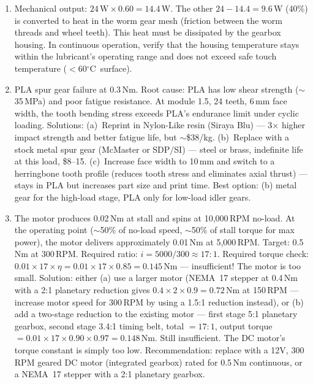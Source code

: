\documentclass[11pt,letterpaper,twoside,openany]{book}
\newcommand{\degC}{\ensuremath{{}^{\circ}\text{C}}}
\begin{document}
\begin{enumerate}[leftmargin=1.5em]
\item Mechanical output: $24\,\text{W} \times 0.60 = 14.4$\,W. The other $24 - 14.4 = 9.6$\,W (40\%) is converted to heat in the worm gear mesh (friction between the worm threads and wheel teeth). This heat must be dissipated by the gearbox housing. In continuous operation, verify that the housing temperature stays within the lubricant's operating range and does not exceed safe touch temperature ($< 60$\degC\ surface).

\item PLA spur gear failure at 0.3\,Nm. Root cause: PLA has low shear strength ($\sim$35\,MPa) and poor fatigue resistance. At module 1.5, 24 teeth, 6\,mm face width, the tooth bending stress exceeds PLA's endurance limit under cyclic loading. Solutions: (a)~Reprint in Nylon-Like resin (Siraya Blu) --- 3$\times$ higher impact strength and better fatigue life, but $\sim$\$38/kg. (b)~Replace with a stock metal spur gear (McMaster or SDP/SI) --- steel or brass, indefinite life at this load, \$8--15. (c)~Increase face width to 10\,mm and switch to a herringbone tooth profile (reduces tooth stress and eliminates axial thrust) --- stays in PLA but increases part size and print time. Best option: (b) metal gear for the high-load stage, PLA only for low-load idler gears.

\item The motor produces 0.02\,Nm at stall and spins at 10,000\,RPM no-load. At the operating point ($\sim$50\% of no-load speed, $\sim$50\% of stall torque for max power), the motor delivers approximately 0.01\,Nm at 5,000\,RPM. Target: 0.5\,Nm at 300\,RPM. Required ratio: $i = 5000/300 \approx 17:1$. Required torque check: $0.01 \times 17 \times \eta = 0.01 \times 17 \times 0.85 = 0.145$\,Nm --- insufficient! The motor is too small. Solution: either (a) use a larger motor (NEMA~17 stepper at 0.4\,Nm with a 2:1 planetary reduction gives $0.4 \times 2 \times 0.9 = 0.72$\,Nm at 150\,RPM --- increase motor speed for 300\,RPM by using a 1.5:1 reduction instead), or (b) add a two-stage reduction to the existing motor --- first stage 5:1 planetary gearbox, second stage 3.4:1 timing belt, total $= 17:1$, output torque $= 0.01 \times 17 \times 0.90 \times 0.97 = 0.148$\,Nm. Still insufficient. The DC motor's torque constant is simply too low. Recommendation: replace with a 12V, 300\,RPM geared DC motor (integrated gearbox) rated for 0.5\,Nm continuous, or a NEMA~17 stepper with a 2:1 planetary gearbox.
\end{enumerate}
\end{document}
